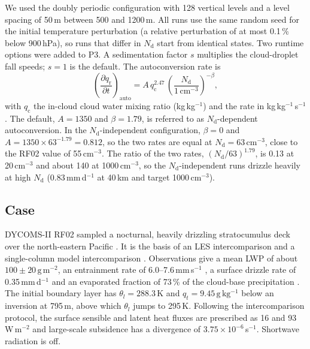 \documentclass[acp, manuscript]{copernicus}
\newcommand{\Nd}{N_\mathrm{d}}
\newcommand{\cmthree}{\mathrm{cm^{-3}}}
\newcommand{\gmm}{\mathrm{g\,m^{-2}}}
\begin{document}
We used the doubly periodic configuration \citep[DP-EAMxx or DP-SCREAM;][]{bogenschutz2023,bogenschutz2025} with 128 vertical levels and a level spacing of 50\,m between 500 and 1200\,m. All runs use the same random seed for the initial temperature perturbation (a relative perturbation of at most 0.1\,\% below 900\,hPa), so runs that differ in $\Nd$ start from identical states. Two runtime options were added to P3. A sedimentation factor $s$ multiplies the cloud-droplet fall speeds; $s=1$ is the default. The autoconversion rate is
\begin{equation}
\left(\frac{\partial q_\mathrm{r}}{\partial t}\right)_\mathrm{auto} = A\, q_\mathrm{c}^{2.47}\, \left(\frac{\Nd}{1\,\cmthree}\right)^{-\beta},
\label{eq:kk}
\end{equation}
with $q_\mathrm{c}$ the in-cloud cloud water mixing ratio (kg\,kg$^{-1}$) and the rate in kg\,kg$^{-1}$\,s$^{-1}$. The default, $A=1350$ and $\beta=1.79$, is referred to as $\Nd$-dependent autoconversion. In the $\Nd$-independent configuration, $\beta=0$ and $A=1350\times63^{-1.79}=0.812$, so the two rates are equal at $\Nd=63\,\cmthree$, close to the RF02 value of 55\,$\cmthree$. The ratio of the two rates, $(\Nd/63)^{1.79}$, is 0.13 at 20\,$\cmthree$ and about 140 at 1000\,$\cmthree$, so the $\Nd$-independent runs drizzle heavily at high $\Nd$ (0.83\,mm\,d$^{-1}$ at 40\,km and target 1000\,$\cmthree$).

\subsection{Case}

DYCOMS-II RF02 sampled a nocturnal, heavily drizzling stratocumulus deck over the north-eastern Pacific \citep{stevens2003,vanzanten2005,vanzanten2005b}. It is the basis of an LES intercomparison \citep{ackerman2009} and a single-column model intercomparison \citep{wyant2007}. Observations give a mean LWP of about $100\pm20\,\gmm$, an entrainment rate of 6.0--7.6\,mm\,s$^{-1}$ \citep{faloona2005}, a surface drizzle rate of 0.35\,mm\,d$^{-1}$ and an evaporated fraction of 73\,\% of the cloud-base precipitation \citep{vanzanten2005,wyant2007}. The initial boundary layer has $\theta_l=288.3$\,K and $q_t=9.45\,\mathrm{g\,kg^{-1}}$ below an inversion at 795\,m, above which $\theta_l$ jumps to 295\,K. Following the intercomparison protocol, the surface sensible and latent heat fluxes are prescribed as 16 and 93\,W\,m$^{-2}$ and large-scale subsidence has a divergence of $3.75\times10^{-6}$\,s$^{-1}$. Shortwave radiation is off.
\end{document}
